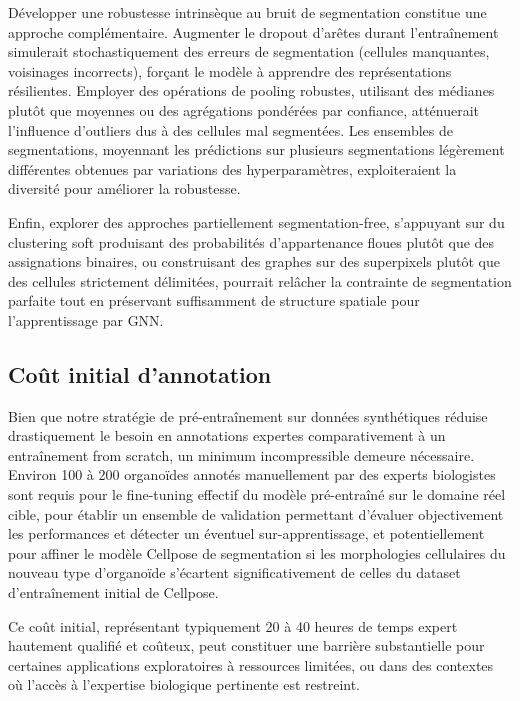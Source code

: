 Développer une robustesse intrinsèque au bruit de segmentation constitue une approche complémentaire. Augmenter le dropout d'arêtes durant l'entraînement simulerait stochastiquement des erreurs de segmentation (cellules manquantes, voisinages incorrects), forçant le modèle à apprendre des représentations résilientes. Employer des opérations de pooling robustes, utilisant des médianes plutôt que moyennes ou des agrégations pondérées par confiance, atténuerait l'influence d'outliers dus à des cellules mal segmentées. Les ensembles de segmentations, moyennant les prédictions sur plusieurs segmentations légèrement différentes obtenues par variations des hyperparamètres, exploiteraient la diversité pour améliorer la robustesse.

Enfin, explorer des approches partiellement segmentation-free, s'appuyant sur du clustering soft produisant des probabilités d'appartenance floues plutôt que des assignations binaires, ou construisant des graphes sur des superpixels plutôt que des cellules strictement délimitées, pourrait relâcher la contrainte de segmentation parfaite tout en préservant suffisamment de structure spatiale pour l'apprentissage par GNN.

\subsection{Coût initial d'annotation}

Bien que notre stratégie de pré-entraînement sur données synthétiques réduise drastiquement le besoin en annotations expertes comparativement à un entraînement from scratch, un minimum incompressible demeure nécessaire. Environ 100 à 200 organoïdes annotés manuellement par des experts biologistes sont requis pour le fine-tuning effectif du modèle pré-entraîné sur le domaine réel cible, pour établir un ensemble de validation permettant d'évaluer objectivement les performances et détecter un éventuel sur-apprentissage, et potentiellement pour affiner le modèle Cellpose de segmentation si les morphologies cellulaires du nouveau type d'organoïde s'écartent significativement de celles du dataset d'entraînement initial de Cellpose. 

Ce coût initial, représentant typiquement 20 à 40 heures de temps expert hautement qualifié et coûteux, peut constituer une barrière substantielle pour certaines applications exploratoires à ressources limitées, ou dans des contextes où l'accès à l'expertise biologique pertinente est restreint.

